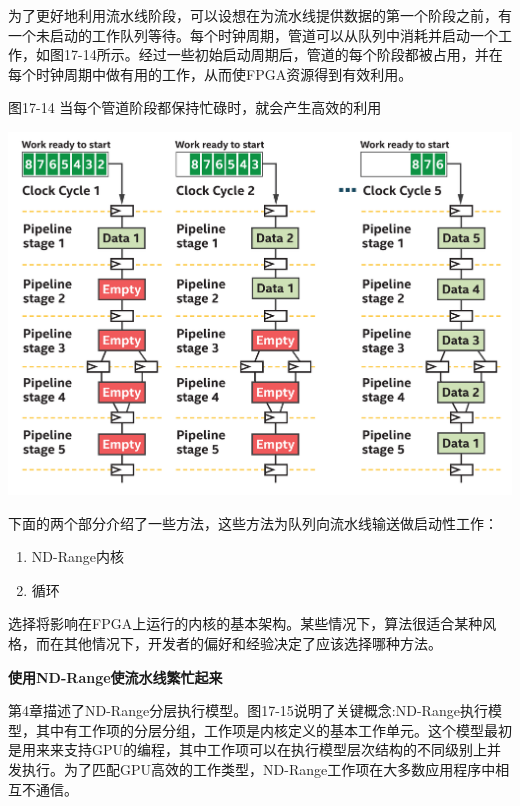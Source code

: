为了更好地利用流水线阶段，可以设想在为流水线提供数据的第一个阶段之前，有一个未启动的工作队列等待。每个时钟周期，管道可以从队列中消耗并启动一个工作，如图17-14所示。经过一些初始启动周期后，管道的每个阶段都被占用，并在每个时钟周期中做有用的工作，从而使FPGA资源得到有效利用。\par

\hspace*{\fill} \par %
图17-14 当每个管道阶段都保持忙碌时，就会产生高效的利用
\begin{center}
	\includegraphics[width=1.0\textwidth]{content/chapter-17/images/13}
\end{center}

下面的两个部分介绍了一些方法，这些方法为队列向流水线输送做启动性工作：\par

\begin{enumerate}
	\item ND-Range内核
	\item 循环
\end{enumerate}

选择将影响在FPGA上运行的内核的基本架构。某些情况下，算法很适合某种风格，而在其他情况下，开发者的偏好和经验决定了应该选择哪种方法。\par

\hspace*{\fill} \par %
\textbf{使用ND-Range使流水线繁忙起来}

第4章描述了ND-Range分层执行模型。图17-15说明了关键概念:ND-Range执行模型，其中有工作项的分层分组，工作项是内核定义的基本工作单元。这个模型最初是用来来支持GPU的编程，其中工作项可以在执行模型层次结构的不同级别上并发执行。为了匹配GPU高效的工作类型，ND-Range工作项在大多数应用程序中相互不通信。\par

